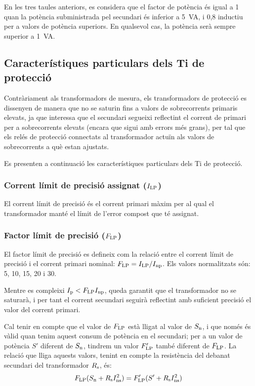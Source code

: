En les tres taules anteriors, es considera que el factor de
potència és igual a 1 quan la potència subministrada pel secundari és inferior a \SI{5}{VA}, i 0,8 inductiu per a valors de potència superiors. En qualsevol cas, la potència serà sempre superior a \SI{1}{VA}.


\subsection{Característiques particulars dels Ti de protecció}

Contràriament als transformadors de mesura, els transformadors de
protecció es dissenyen de manera que no se saturin fins a  valors
de sobrecorrents primaris elevats, ja que interessa que el
secundari segueixi reflectint el corrent de primari per a
 sobrecorrents elevats (encara que sigui amb errors més grans), per
tal que els relés de protecció connectats al transformador actuïn
als valors de sobrecorrents a què estan ajustats.

Es presenten a continuació les característiques particulars dels Ti
de protecció.

\subsubsection{Corrent límit de precisió assignat ($I_\mathrm{LP}$)}

El corrent
límit de precisió és el corrent primari màxim per al qual el transformador manté el límit
de l'error compost que té assignat.

\subsubsection{Factor límit de precisió ($F_\mathrm{LP}$) }

 El factor límit de precisió
es defineix com la relació entre el corrent límit de precisió
i el corrent primari nominal: $F_\mathrm{LP} = I_\mathrm{LP} /I_\mathrm{np}$.
Els valors normalitzats són: 5, 10, 15, 20 i 30.

Mentre es compleixi  $I_\mathrm{p}<F_\mathrm{LP} I_\mathrm{np}$, queda garantit
que el transformador no se saturarà, i per tant el corrent
secundari seguirà reflectint amb suficient precisió el valor del
corrent primari.

Cal tenir en compte que el valor de $F_\mathrm{LP}$ està lligat
 al valor de $S_\mathrm{n}$, i que només és vàlid
quan tenim aquest consum de  potència en el secundari; per a un
valor de potència $S'$ diferent de $S_\mathrm{n}$, tindrem un valor
$F'_\mathrm{LP}$ també diferent de  $F_\mathrm{LP}$. La relació que
lliga aquests valors, tenint en compte la resistència del debanat
secundari del transformador  $R_\mathrm{s}$, és:
\begin{equation}\label{eq:flp}
    F_\mathrm{LP} (S_\mathrm{n}+R_\mathrm{s}I_\mathrm{ns}^2) =
    F'_\mathrm{LP} (S'+R_\mathrm{s}I_\mathrm{ns}^2)
\end{equation}

